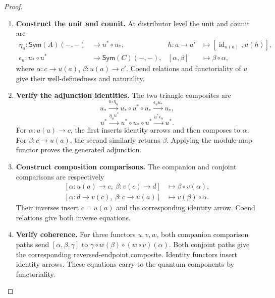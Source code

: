 \documentclass[oneside]{article}
\newcommand{\Sym}{\mathsf{Sym}}
\newcommand{\id}{\operatorname{id}}
\theoremstyle{plain}
\theoremstyle{definition}
\theoremstyle{remark}
\begin{document}
\begin{proof}
    \leavevmode
    \begin{enumerate}[beginpenalty=10000]
        \item \textbf{Construct the unit and counit.}
        At distributor level the unit and counit are
        \[
        \begin{aligned}
        \eta_u:\Sym(A)(-,-)&\longrightarrow u^*\circ u_*,
        &h:a\to a'&\longmapsto[\id_{u(a)},u(h)],\\
        \epsilon_u:u_*\circ u^*&\longrightarrow \Sym(C)(-,-),
        &[\alpha,\beta]&\longmapsto\beta\circ\alpha,
        \end{aligned}
        \]
        where \(\alpha:c\to u(a)\), \(\beta:u(a)\to c'\).
        Coend relations and functoriality of \(u\) give their
        well-definedness and naturality.

        \item \textbf{Verify the adjunction identities.}
        The two triangle composites are
        \[
        u_*\xrightarrow{u_*\eta_u}u_*\circ u^*\circ u_*
          \xrightarrow{\epsilon_u u_*}u_*,
        \]
        \[
        u^*\xrightarrow{\eta_u u^*}u^*\circ u_*\circ u^*
          \xrightarrow{u^*\epsilon_u}u^*.
        \]
        For \(\alpha:u(a)\to c\), the first inserts identity arrows
        and then composes to \(\alpha\). For \(\beta:c\to u(a)\),
        the second similarly returns \(\beta\). Applying the
        module-map functor proves the generated adjunction.

        \item \textbf{Construct composition comparisons.}
        The companion and conjoint comparisons are respectively
        \[
        \begin{aligned}
        [\alpha:u(a)\to c,\ \beta:v(c)\to d]
          &\longmapsto\beta\circ v(\alpha),\\
        [\alpha:d\to v(c),\ \beta:c\to u(a)]
          &\longmapsto v(\beta)\circ\alpha.
        \end{aligned}
        \]
        Their inverses insert \(c=u(a)\) and the corresponding
        identity arrow. Coend relations give both inverse equations.

        \item \textbf{Verify coherence.}
        For three functors \(u,v,w\), both companion comparison paths
        send \([\alpha,\beta,\gamma]\) to
        \(\gamma\circ w(\beta)\circ(w\circ v)(\alpha)\).
        Both conjoint paths give the corresponding reversed-endpoint
        composite. Identity functors insert identity arrows.
        These equations carry to the quantum components by functoriality. \qedhere
    \end{enumerate}
\end{proof}
\end{document}
